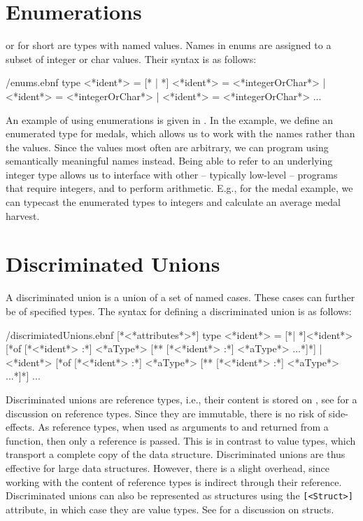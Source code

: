 \section{Enumerations}
\label{sec:enums}
 or  for short are types with named values. Names in enums are assigned to a subset of integer or char values. Their syntax is as follows:
%
\begin{verbatimwrite}{\ebnf/enums.ebnf}
type <*ident*> = 
  [* | *] <*ident*> = <*integerOrChar*>
  | <*ident*> = <*integerOrChar*>
  | <*ident*> = <*integerOrChar*>
  ...
\end{verbatimwrite}
%
An example of using enumerations is given in .
%
%
In the example, we define an enumerated type for medals, which allows us to work with the names rather than the values. Since the values most often are arbitrary, we can program using semantically meaningful names instead. Being able to refer to an underlying integer type allows us to interface with other -- typically low-level -- programs that require integers, and to perform arithmetic. E.g., for the medal example, we can typecast the enumerated types to integers and calculate an average medal harvest.

\section{Discriminated Unions}
\label{sec:discriminatedUnions}
A discriminated union is a union of a set of named cases. These cases can further be of specified types. The syntax for defining a discriminated union is as follows:
%
\begin{verbatimwrite}{\ebnf/discrimiatedUnions.ebnf}
[*<*attributes*>*] 
type <*ident*> = 
  [*| *]<*ident*> [*of [*<*ident*> :*] <*aType*> [** [*<*ident*> :*] <*aType*> ...*]*]
  | <*ident*> [*of [*<*ident*> :*] <*aType*> [** [*<*ident*> :*] <*aType*> ...*]*]
  ...
\end{verbatimwrite}
%
Discriminated unions are reference types, i.e., their content is stored on , see  for a discussion on reference types. Since they are immutable, there is no risk of side-effects. As reference types, when used as arguments to and returned from a function, then only a reference is passed. This is in contrast to value types, which transport a complete copy of the data structure. Discriminated unions are thus effective for large data structures. However, there is a slight overhead, since working with the content of reference types is indirect through their reference. Discriminated unions can also be represented as structures using the \lstinline{[<Struct>]} attribute, in which case they are value types. See  for a discussion on structs.


